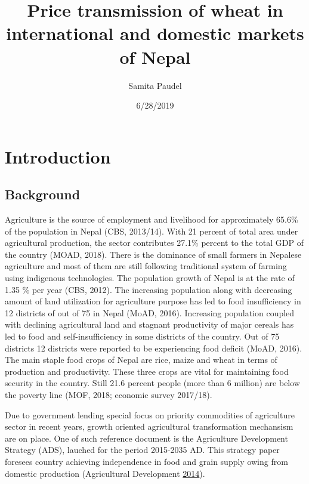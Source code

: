 \documentclass[12pt,]{article}
\title{Price transmission of wheat in international and domestic markets of Nepal}
\author{Samita Paudel}
\date{6/28/2019}
\begin{document}
\maketitle

\hypertarget{introduction}{%
\section{Introduction}\label{introduction}}

\hypertarget{background}{%
\subsection{Background}\label{background}}

Agriculture is the source of employment and livelihood for approximately 65.6\% of the population in Nepal (CBS, 2013/14). With 21 percent of total area under agricultural production, the sector contributes 27.1\% percent to the total GDP of the country (MOAD, 2018). There is the dominance of small farmers in Nepalese agriculture and most of them are still following traditional system of farming using indigenous technologies. The population growth of Nepal is at the rate of 1.35 \% per year (CBS, 2012). The increasing population along with decreasing amount of land utilization for agriculture purpose has led to food insufficiency in 12 districts of out of 75 in Nepal (MoAD, 2016). Increasing population coupled with declining agricultural land and stagnant productivity of major cereals has led to food and self-insufficiency in some districts of the country. Out of 75 districts 12 districts were reported to be experiencing food deficit (MoAD, 2016). The main staple food crops of Nepal are rice, maize and wheat in terms of production and productivity. These three crops are vital for maintaining food security in the country. Still 21.6 percent people (more than 6 million) are below the poverty line (MOF, 2018; economic survey 2017/18).

Due to government lending special focus on priority commodities of agriculture sector in recent years, growth oriented agricultural transformation mechansism are on place. One of such reference document is the Agriculture Development Strategy (ADS), lauched for the period 2015-2035 AD. This strategy paper foresees country achieving independence in food and grain supply owing from domestic production (Agricultural Development \protect\hyperlink{ref-moadads2014}{2014}).
\end{document}
